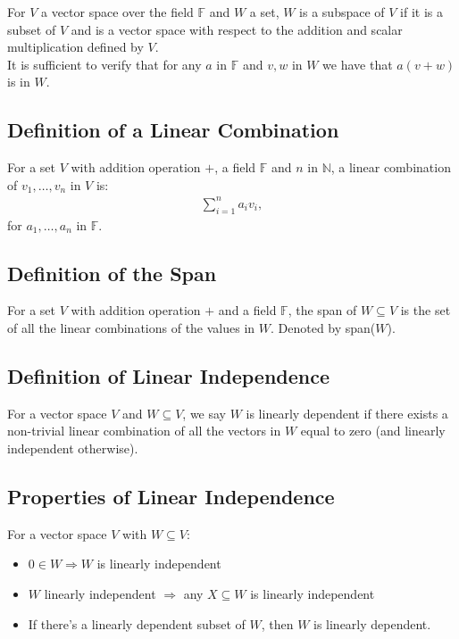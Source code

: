 \documentclass[a4paper, 12pt, twoside]{article}
\begin{document}
For $V$ a vector space over the field $\mathbb{F}$ and $W$ a set, $W$ is a 
subspace of $V$ if it is a subset of $V$ and is a vector space with respect 
to the addition and scalar multiplication defined by $V$.
\\[\baselineskip]
It is sufficient to verify that for any $a$ in $\mathbb{F}$ and $v, w$ in $W$ we
have that $a(v + w)$ is in $W$.

\subsection{Definition of a Linear Combination}

For a set $V$ with addition operation $+$, a field $\mathbb{F}$ and $n$ in 
$\mathbb{N}$, a linear combination of $v_1, \ldots, v_n$ in $V$ is: \begin{gather*}
  \sum_{i = 1}^n a_iv_i,
\end{gather*} for $a_1, \ldots, a_n$ in $\mathbb{F}$.

\subsection{Definition of the Span}

For a set $V$ with addition operation $+$ and a field $\mathbb{F}$, the span 
of $W \subseteq V$ is the set of all the linear combinations of the values
in $W$. Denoted by span($W$).

\subsection{Definition of Linear Independence}

For a vector space $V$ and $W \subseteq V$, we say $W$ is linearly dependent if
there exists a non-trivial linear combination of all the vectors in $W$ 
equal to zero (and linearly independent otherwise).

\subsection{Properties of Linear Independence}

For a vector space $V$ with $W \subseteq V$: \begin{itemize}
  \item $0 \in W \Rightarrow W$ is linearly independent
  \item $W$ linearly independent $\Rightarrow$ any $X \subseteq W$ 
  is linearly independent
  \item If there's a linearly dependent subset of $W$, then $W$
  is linearly dependent.
\end{itemize}
\end{document}
